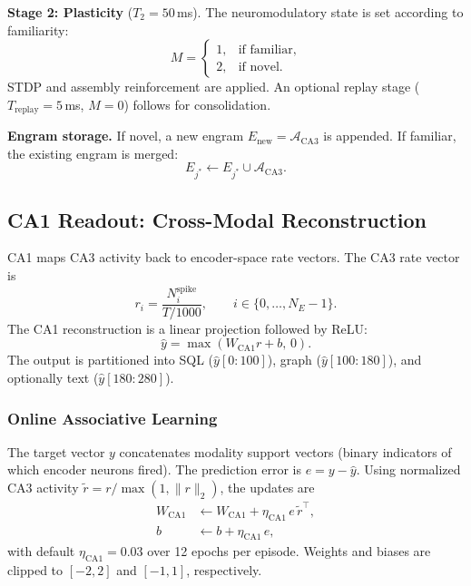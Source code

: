 \textbf{Stage 2: Plasticity} ($T_2 = 50$\,ms). The neuromodulatory state is set according to familiarity:
\begin{equation}
M =
\begin{cases}
1, & \text{if familiar}, \\
2, & \text{if novel}.
\end{cases}
\end{equation}
STDP and assembly reinforcement are applied. An optional replay stage ($T_{\mathrm{replay}} = 5$\,ms, $M=0$) follows for consolidation.

\textbf{Engram storage.} If novel, a new engram $E_{\mathrm{new}} = \mathcal{A}_{\mathrm{CA3}}$ is appended. If familiar, the existing engram is merged:
\begin{equation}
E_{j^*} \leftarrow E_{j^*} \cup \mathcal{A}_{\mathrm{CA3}}.
\end{equation}


\subsection{CA1 Readout: Cross-Modal Reconstruction}
\label{sec:ca1}

CA1 maps CA3 activity back to encoder-space rate vectors. The CA3 rate vector is
\begin{equation}
r_i = \frac{N_i^{\mathrm{spike}}}{T/1000}, \qquad i \in \{0, \dots, N_E-1\}.
\end{equation}
The CA1 reconstruction is a linear projection followed by ReLU:
\begin{equation}
\hat{y} = \max(W_{\mathrm{CA1}} r + b,\, 0).
\end{equation}
The output is partitioned into SQL ($\hat{y}[0:100]$), graph ($\hat{y}[100:180]$), and optionally text ($\hat{y}[180:280]$).

\subsubsection{Online Associative Learning}

The target vector $y$ concatenates modality support vectors (binary indicators of which encoder neurons fired). The prediction error is $e = y - \hat{y}$. Using normalized CA3 activity $\tilde{r} = r / \max(1, \|r\|_2)$, the updates are
\begin{align}
W_{\mathrm{CA1}} &\leftarrow W_{\mathrm{CA1}} + \eta_{\mathrm{CA1}}\, e\, \tilde{r}^{\top}, \\
b &\leftarrow b + \eta_{\mathrm{CA1}}\, e,
\end{align}
with default $\eta_{\mathrm{CA1}} = 0.03$ over 12 epochs per episode. Weights and biases are clipped to $[-2, 2]$ and $[-1, 1]$, respectively.

